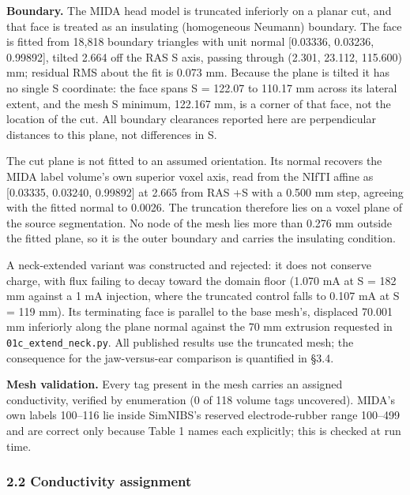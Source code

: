 \documentclass[
  11pt,
  letterpaper,
]{article}
\begin{document}
\textbf{Boundary.} The MIDA head model is truncated inferiorly on a planar cut, and
that face is treated as an insulating (homogeneous Neumann) boundary. The face
is fitted from 18,818 boundary triangles with unit normal {[}\textminus{}0.03336, \textminus{}0.03236,
\textminus{}0.99892{]}, tilted 2.664\textdegree{} off the RAS S axis, passing through (\textminus{}2.301, 23.112,
\textminus{}115.600) mm; residual RMS about the fit is 0.073 mm. Because the plane is
tilted it has no single S coordinate: the face spans S = \textminus{}122.07 to \textminus{}110.17 mm
across its lateral extent, and the mesh S minimum, \textminus{}122.167 mm, is a corner of
that face, not the location of the cut. All boundary clearances reported here
are perpendicular distances to this plane, not differences in S.

The cut plane is not fitted to an assumed orientation. Its normal recovers the
MIDA label volume's own superior voxel axis, read from the NIfTI affine as
{[}0.03335, 0.03240, 0.99892{]} at 2.665\textdegree{} from RAS +S with a 0.500 mm step, agreeing
with the fitted normal to 0.0026\textdegree{}. The truncation therefore lies on a voxel plane
of the source segmentation. No node of the mesh lies more than 0.276 mm outside
the fitted plane, so it is the outer boundary and carries the insulating
condition.

A neck-extended variant was constructed and rejected: it does not conserve
charge, with flux failing to decay toward the domain floor (1.070 mA at S =
\textminus{}182 mm against a 1 mA injection, where the truncated control falls to 0.107 mA
at S = \textminus{}119 mm). Its terminating face is parallel to the base mesh's, displaced
70.001 mm inferiorly along the plane normal against the 70 mm extrusion
requested in \texttt{01c\_extend\_neck.py}. All published results use the truncated mesh;
the consequence for the jaw-versus-ear comparison is quantified in §3.4.

\textbf{Mesh validation.} Every tag present in the mesh carries an assigned
conductivity, verified by enumeration (0 of 118 volume tags uncovered). MIDA's
own labels 100--116 lie inside SimNIBS's reserved electrode-rubber range 100--499
and are correct only because Table 1 names each explicitly; this is checked at
run time.

\subsubsection{2.2 Conductivity assignment}\label{conductivity-assignment}
\end{document}
